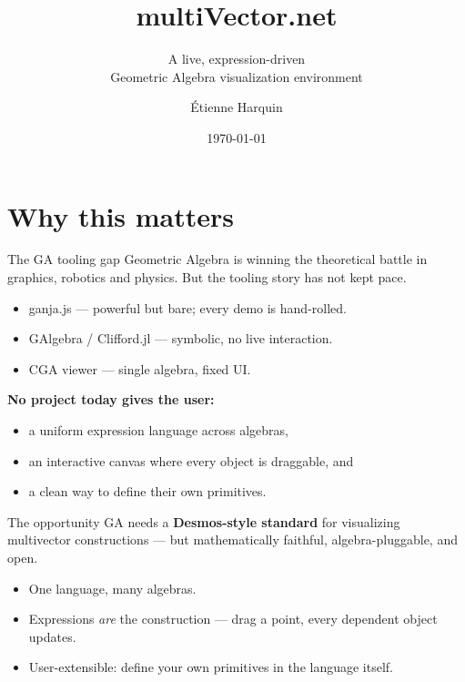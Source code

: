 \documentclass[aspectratio=169,11pt]{beamer}
\title{\textbf{multiVector.net}}
\subtitle{A live, expression-driven \\ Geometric Algebra visualization environment}
\author{Étienne Harquin}
\institute{PhD candidate}
\date{\today}
\begin{document}
\maketitle

\section{Why this matters}

\begin{frame}{The GA tooling gap}
  Geometric Algebra is winning the theoretical battle in graphics, robotics
  and physics. But the tooling story has not kept pace.
  \begin{itemize}
    \item \alert{ganja.js} — powerful but bare; every demo is hand-rolled.
    \item \alert{GAlgebra / Clifford.jl} — symbolic, no live interaction.
    \item \alert{CGA viewer} — single algebra, fixed UI.
  \end{itemize}
  \vfill
  \textbf{No project today gives the user:}
  \begin{itemize}
    \item a uniform expression language across algebras,
    \item an interactive canvas where every object is draggable, and
    \item a clean way to define their own primitives.
  \end{itemize}
\end{frame}

\begin{frame}{The opportunity}
  GA needs a \textbf{Desmos-style standard} for visualizing multivector
  constructions — but mathematically faithful, algebra-pluggable, and
  open.

  \begin{center}
  \end{center}

  \begin{itemize}
    \item One language, many algebras.
    \item Expressions \emph{are} the construction — drag a point, every
          dependent object updates.
    \item User-extensible: define your own primitives in the language itself.
  \end{itemize}
\end{frame}
\end{document}
